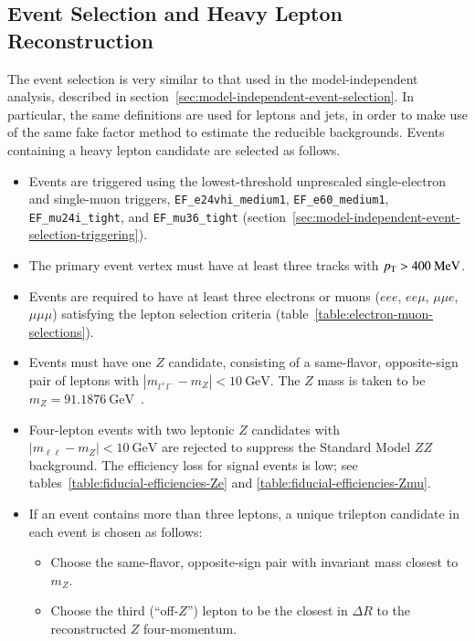 \subsection{Event Selection and Heavy Lepton Reconstruction}\label{sec:event-3l-selection}
The event selection is very similar to that used in the model-independent analysis, described in section~\ref{sec:model-independent-event-selection}. In particular, the same definitions are used for leptons and jets, in order to make use of the same fake factor method to estimate the reducible backgrounds. Events containing a heavy lepton candidate are selected as follows.

\begin{itemize}
	\item Events are triggered using the lowest-threshold unprescaled single-electron and single-muon triggers, \texttt{EF\_e24vhi\_medium1}, \texttt{EF\_e60\_medium1}, \texttt{EF\_mu24i\_tight}, and \texttt{EF\_mu36\_tight} (section~\ref{sec:model-independent-event-selection-triggering}).
	\item The primary event vertex must have at least three tracks with $p_{\text{T}}>400~\mbox{MeV}$.
	\item Events are required to have at least three electrons or muons ($eee$, $ee\mu$, $\mu\mu e$, $\mu\mu\mu$) satisfying the lepton selection criteria (table~\ref{table:electron-muon-selections}). 
	\item Events must have one $Z$ candidate, consisting of a same-flavor, opposite-sign pair of leptons with $|m_{l^+l^-}-m_{Z}|<10~\mbox{GeV}$. The $Z$ mass is taken to be $m_Z=91.1876~\mbox{GeV}$~\cite{pdg}. 
	\item Four-lepton events with two leptonic $Z$ candidates with $|m_{\ell\ell}-m_Z|<\SI{10}{\giga\electronvolt}$ are rejected to suppress the Standard Model $ZZ$ background. The efficiency loss for signal events is low; see tables~\ref{table:fiducial-efficiencies-Ze} and \ref{table:fiducial-efficiencies-Zmu}. 
	\item If an event contains more than three leptons, a unique trilepton candidate in each event is chosen as follows:
	\begin{itemize}
		\item Choose the same-flavor, opposite-sign pair with invariant mass closest to $m_{Z}$.
		\item Choose the third (``off-$Z$'') lepton to be the closest in $\Delta R$ to the reconstructed $Z$ four-momentum.
	\end{itemize}

\end{itemize}
